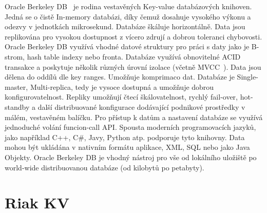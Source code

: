 \documentclass[czech,bachelor,dept460,male,csharp,cpdeclaration]{diploma}
\begin{document}
	Oracle Berkeley DB~\cite{berkeleydb} je rodina vestavěných Key-value databázových knihoven. Jedná se o čistě In-memory databázi, díky čemuž dosahuje vysokého výkonu a odezvy v jednotkách mikrosekund. Databáze škáluje horizontálně. Data jsou replikována pro vysokou dostupnost z vícero zdrují a dobrou toleranci chybovosti. Oracle Berkeley DB využívá vhodné datové struktury pro práci s daty jako je B-strom, hash table indexy nebo fronta. Databáze využívá obnovitelné ACID transakce a poskytuje několik různých úrovní izolace (včetně MVCC~\cite{mvcc}). Data jsou dělena do oddílů dle key ranges. Umožňuje komprimaco dat. Databáze je Single-master, Multi-replica, tedy je vysoce dostupná a umožňuje dobrou konfigurovatelnost. Repliky umožňují čtecí škálovatelnost, rychlý fail-over, hot-standby a další distribuované konfigurace dodávající podnikové prostředky v málém, vestavěném balíčku. Pro přístup k datům a nastavení databáze se využívá jednoduché volání funcion-call API. Spousta moderních programovacích jazyků, jako například C++, C\#, Javy, Python atp. podporuje tyto knihovny. Data mohou být ukládána v nativním formátu aplikace, XML, SQL nebo jako Java Objekty. Oracle Berkeley DB je vhodný nástroj pro vše od lokálního uložiště po world-wide distribuovanou databáze (od kilobytů po petabyty).
	
	\section{Riak KV}
	
\end{document}

